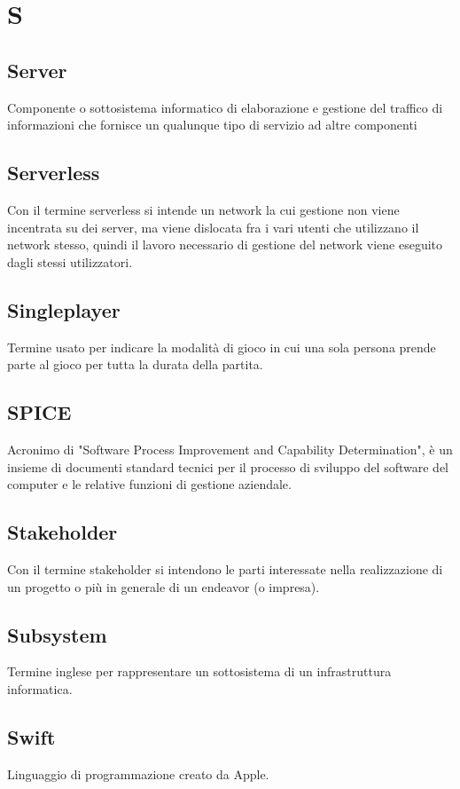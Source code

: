 \section{S}
	\subsection{Server}
		Componente o sottosistema informatico di elaborazione e gestione del traffico di informazioni che fornisce un qualunque tipo di servizio ad altre componenti
	\subsection{Serverless} 
		Con il termine serverless si intende un network la cui gestione non viene incentrata su dei server, ma viene dislocata fra i vari utenti che utilizzano il network stesso, quindi il lavoro necessario di gestione del network viene eseguito dagli stessi utilizzatori.
	\subsection{Singleplayer}
		Termine usato per indicare la modalità di gioco in cui una sola persona prende parte al gioco per tutta la durata della partita.
	\subsection{SPICE}
		Acronimo di "Software Process Improvement and Capability Determination", è un insieme di documenti standard tecnici per il processo di sviluppo del software del computer e le relative funzioni di gestione aziendale.
	\subsection{Stakeholder}  
		Con il termine stakeholder si intendono le parti interessate nella realizzazione di un progetto o più in generale di un endeavor (o impresa).
	\subsection{Subsystem}
		Termine inglese per rappresentare un sottosistema di un infrastruttura informatica.
	\subsection{Swift}
	    Linguaggio di programmazione creato da Apple.

\newpage